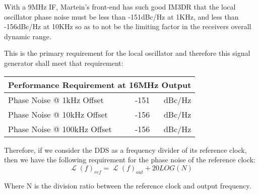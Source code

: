 \documentclass[letterpaper,12pt]{article}
\DeclareMathOperator{\Lph}{\mathscr{L}}
\begin{document}
With a 9MHz IF, Martein's front-end has such good IM3DR that the local oscillator
phase noise must be less than -151dBc/Hz at 1KHz, and less than -156dBc/Hz at 
10KHz so as to not be the limiting factor in the receivers overall dynamic range.

This is the primary requirement for the local oscillator and therefore this signal 
generator shall meet that requirement:
\begin{center}
\begin{tabular}{| l | c | r |}
\hline
\multicolumn{3}{|l|}{Performance Requirement at 16MHz Output} \\ \hline
Phase Noise @ 1kHz Offset & -151 & dBc/Hz \\ \hline
Phase Noise @ 10kHz Offset & -156 & dBc/Hz \\ \hline
Phase Noise @ 100kHz Offset & -156 & dBc/Hz \\ \hline
\end{tabular}
\end{center}

Therefore, if we consider the DDS as a frequency divider of its reference 
clock, then we have the following requirement for the phase noise of the 
reference clock:
\[
  \Lph(f)_{ref} = \Lph(f)_{out} + 20LOG(N)
\]

Where N is the division ratio between the reference clock and output frequency.
\end{document}
